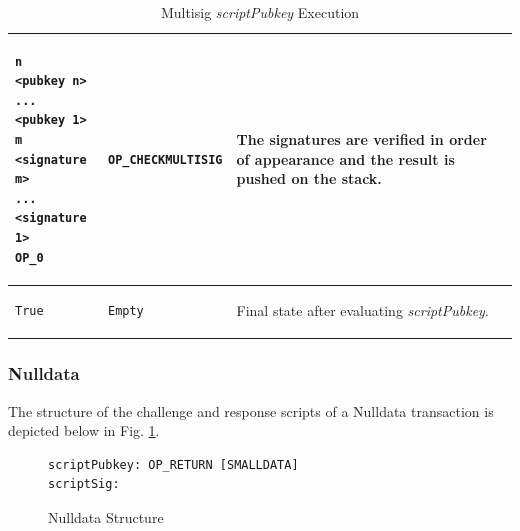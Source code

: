 \begin{table}[!ht]
\begin{minipage}{\textwidth}
\begin{tabular}{| m{95pt} | m{145pt} | m{100pt} |}
\vspace{8pt}
\begin{BVerbatim}[fontsize==\relsize{-4}]
n
<pubkey n>
...
<pubkey 1>
m
<signature m>
...
<signature 1>
OP_0
\end{BVerbatim}
\vspace{4pt}
&
\vspace{8pt}
\begin{BVerbatim}[fontsize==\relsize{-4}]
OP_CHECKMULTISIG
\end{BVerbatim} 
\vspace{4pt}
&
The signatures are verified in order of appearance and the result is pushed on the stack.\\ \hline	


\vspace{8pt}
\begin{BVerbatim}[fontsize==\relsize{-4}]
True
\end{BVerbatim}
\vspace{4pt}
&
\vspace{8pt}
\begin{BVerbatim}[fontsize==\relsize{-4}]
Empty
\end{BVerbatim} 
\vspace{4pt}
&
Final state after evaluating \textit{scriptPubkey}.\\ \hline

\end{tabular}
\vspace{5pt}
\caption{Multisig \textit{scriptPubkey} Execution}
\label{tab:P2Multisig2}

\end{minipage}
\end{table}


\subsubsection{Nulldata}
The structure of the challenge and response scripts of a Nulldata transaction is depicted below in Fig. \ref{fig:Nulldata}.

\vspace{-10pt}
\begin{figure}[htbp]

\begin{Verbatim}[fontsize==\relsize{-4}, frame=single]  
scriptPubkey: OP_RETURN [SMALLDATA]
scriptSig:    
\end{Verbatim}

\vspace{-15pt}
\caption{Nulldata Structure}
\label{fig:Nulldata}
\end{figure}
\vspace{-10pt}

